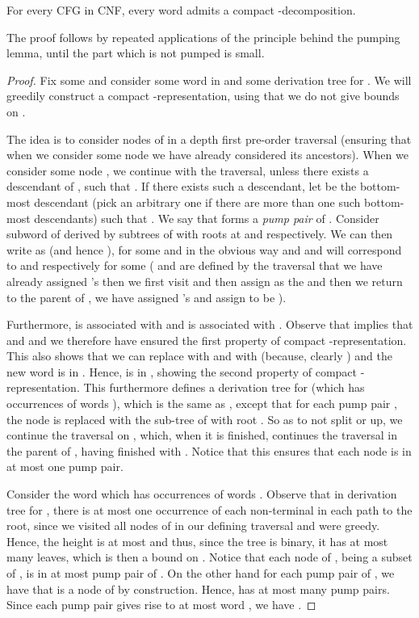 \documentclass{CSML}
\begin{document}
\begin{lem}\label{lem:comp_deco}
For every CFG  in CNF, every word  admits a compact -decomposition.
\end{lem}
\smallskip{} The proof follows by repeated applications of the principle behind the pumping lemma, until the part which is not pumped is small.
\begin{proof}
Fix some  and consider some word  in  and some derivation tree  for .
 We will greedily construct a compact -representation, using that we do not give bounds on . 

 \smallskip{}
 The idea is to consider nodes of  in a depth first pre-order traversal (ensuring that when we consider some node we have already considered its ancestors). 
 When we consider some node , we continue with the traversal, 
 unless there exists a descendant  of , such that . 
 If there exists such a descendant, let  be the bottom-most descendant (pick an arbitrary one if there are more than one such bottom-most descendants) such that . 
 We say that  forms a {\em pump pair} of .
Consider subword  of  derived by subtrees of  with roots at  and  respectively.
 We can then write  as 
 (and hence ), for some  and  in the obvious way and  and  will correspond to  and  respectively for some  ( and  are defined by the traversal that we have already assigned  's then we first visit  and then assign  as the  and then we return to the parent of , we have assigned  's and assign  to be ). 

 Furthermore,  is associated with  and  is associated with . 
Observe that  implies that  and  and we therefore have ensured the first property of compact -representation. 
 This also shows that we can replace  with  and  with  (because, clearly ) and the new word is in . 
 Hence,  is in , showing the second property of compact -representation.
 This furthermore defines a derivation tree  for  (which has  occurrences of words ), 
 which is the same as , except that for each pump pair , the node  is replaced with the sub-tree of  with root .
So as to  not split  or  up, we continue the traversal on , which, when it is finished, continues the traversal in the parent of , having finished with .  Notice that this ensures that each node is in at most one pump pair. 


  \smallskip{}
  Consider the word  which has  occurrences of words . Observe that in derivation tree  for , there is at most one occurrence of each non-terminal in each path to the root, since we visited all nodes of  in our defining traversal and were greedy. 
  Hence, the height is at most  and thus, since the tree is binary, it has at most  many leaves, which is then a bound on .
Notice that each node of , being a subset of , is in at most  pump pair of . On the other  hand for each pump pair  of , we have that  is a node of  by construction. Hence,  has at most  many pump pairs. Since each pump pair gives rise to at most  word , we have .
\end{proof}
\end{document}
